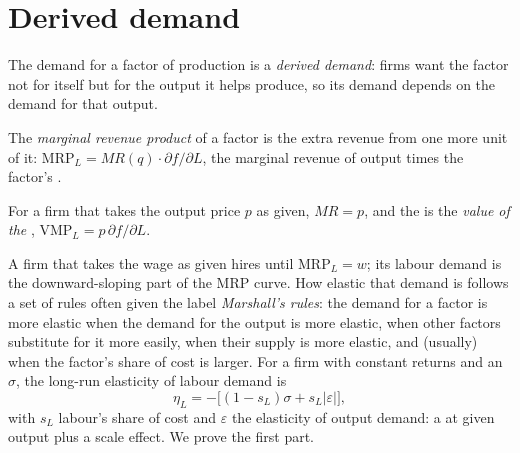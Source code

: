 \section{Derived demand}\label{sec:b1:factor-markets:derived}

\begin{definition}\label{def:b1:factor-markets:derived-demand}
The demand for a factor of production is a \emph{derived demand}: firms want
the factor not for itself but for the output it helps produce, so its
demand depends on the demand for that output.
\end{definition}

\begin{definition}\label{def:b1:factor-markets:mrp}
The \emph{marginal revenue product} of a factor is the extra revenue from
one more unit of it: $\mathrm{MRP}_L = MR(q)\cdot\partial f/\partial L$, the marginal revenue of output
times the factor's .
\end{definition}

\begin{definition}\label{def:b1:factor-markets:vmp}
For a firm that takes the output price $p$ as given, $MR = p$, and the
 is the \emph{value of the },
$\mathrm{VMP}_L = p\,\partial f/\partial L$.
\end{definition}

A firm that takes the wage as given hires until $\mathrm{MRP}_L = w$; its labour
demand is the downward-sloping part of the MRP curve. How elastic that
demand is follows a set of rules often given the label \emph{Marshall's
rules}: the demand for a factor is more elastic when the demand for the
output is more elastic, when other factors substitute for it more easily,
when their supply is more elastic, and (usually) when the factor's share of
cost is larger. For a firm with constant returns and an  $\sigma$, the long-run elasticity of labour demand is
\[
\eta_L = -\bigl[(1 - s_L)\sigma + s_L|\varepsilon|\bigr],
\]
with $s_L$ labour's share of cost and $\varepsilon$ the elasticity of output demand: a
 at given output plus a scale effect. We prove the first
part.

